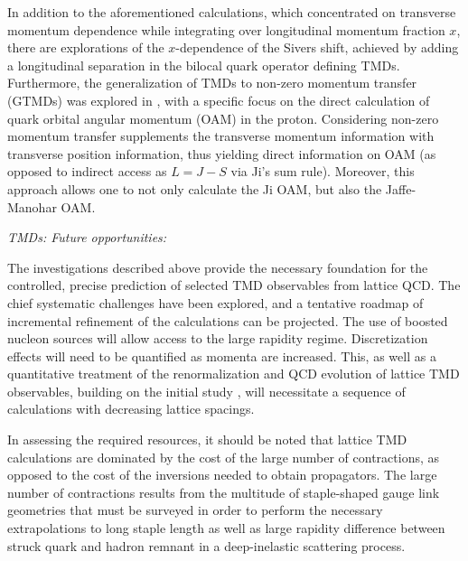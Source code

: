 In addition to the aforementioned calculations, which concentrated on
transverse momentum dependence while integrating over longitudinal
momentum fraction $x$, there are explorations of the
$x$-dependence of the Sivers shift, achieved by adding a
longitudinal separation in the bilocal quark operator defining TMDs.
Furthermore, the generalization
of TMDs to non-zero momentum transfer (GTMDs) was explored in
\cite{Engelhardt:2017miy}, with a specific focus on the direct
calculation of quark orbital angular momentum (OAM) in the proton.
Considering non-zero momentum transfer supplements the transverse
momentum information with transverse position information, thus
yielding direct information on OAM (as opposed to indirect access
as $L=J-S$ via Ji's sum rule). Moreover, this approach allows one
to not only calculate the Ji OAM, but also the Jaffe-Manohar OAM.

{\it TMDs: Future opportunities:}

The investigations described above provide the necessary foundation for
the controlled, precise prediction of selected TMD observables from
lattice QCD. The chief systematic challenges have been explored,
and a tentative roadmap of incremental refinement of the calculations can
be projected. The use of boosted nucleon sources will allow access to the large
rapidity regime. Discretization effects will need to be quantified
as momenta are increased. This, as well as a quantitative treatment
of the renormalization and QCD evolution of lattice TMD observables,
building on the initial study \cite{Yoon:2017qzo}, will necessitate a
sequence of calculations with decreasing lattice spacings.

In assessing the required resources, it should be noted that lattice
TMD calculations are dominated by the cost of the large number of
contractions, as opposed to the cost of the inversions needed to
obtain propagators. The large number of contractions results from the multitude of
staple-shaped gauge link geometries that must be surveyed in order
to perform the necessary extrapolations to long staple length as
well as large rapidity difference between struck quark and hadron
remnant in a deep-inelastic scattering process. 

